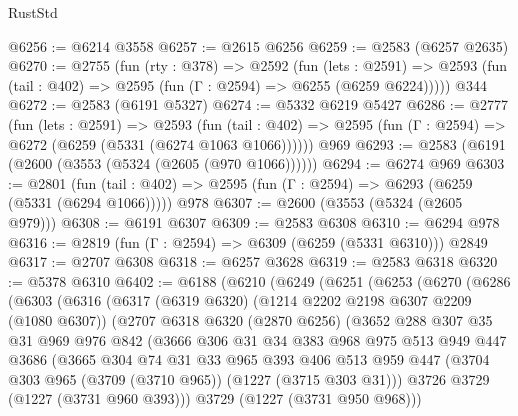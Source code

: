 \begin{lexlean}{RustStd}
\begin{coremodule}
@6256 := @6214 @3558
@6257 := @2615 @6256
@6259 := @2583 (@6257 @2635)
@6270 := @2755
    (fun (rty : @378) =>
    @2592
      (fun (lets : @2591) =>
      @2593 (fun (tail : @402) => @2595 (fun (Γ : @2594) => @6255 (@6259 @6224)))))
    @344
@6272 := @2583 (@6191 @5327)
@6274 := @5332 @6219 @5427
@6286 := @2777
    (fun (lets : @2591) =>
    @2593
      (fun (tail : @402) => @2595 (fun (Γ : @2594) => @6272 (@6259 (@5331 (@6274 @1063 @1066))))))
    @969
@6293 := @2583 (@6191 (@2600 (@3553 (@5324 (@2605 (@970 @1066))))))
@6294 := @6274 @969
@6303 := @2801
    (fun (tail : @402) => @2595 (fun (Γ : @2594) => @6293 (@6259 (@5331 (@6294 @1066)))))
    @978
@6307 := @2600 (@3553 (@5324 (@2605 @979)))
@6308 := @6191 @6307
@6309 := @2583 @6308
@6310 := @6294 @978
@6316 := @2819 (fun (Γ : @2594) => @6309 (@6259 (@5331 @6310))) @2849
@6317 := @2707 @6308
@6318 := @6257 @3628
@6319 := @2583 @6318
@6320 := @5378 @6310
@6402 := @6188
    (@6210
      (@6249
        (@6251
          (@6253
            (@6270
              (@6286
                (@6303
                  (@6316
                    (@6317
                      (@6319 @6320)
                      (@1214 @2202 @2198 @6307 @2209 (@1080 @6307))
                      (@2707
                        @6318
                        @6320
                        (@2870 @6256)
                        (@3652
                          @288
                          @307
                          @35
                          @31
                          @969
                          @976
                          @842
                          (@3666
                            @306
                            @31
                            @34
                            @383
                            @968
                            @975
                            @513
                            @949
                            @447
                            @3686
                            (@3665
                              @304
                              @74
                              @31
                              @33
                              @965
                              @393
                              @406
                              @513
                              @959
                              @447
                              (@3704 @303 @965 (@3709 (@3710 @965)) (@1227 (@3715 @303 @31)))
                              @3726
                              @3729
                              (@1227 (@3731 @960 @393)))
                            @3729
                            (@1227 (@3731 @950 @968)))

\end{coremodule}
\end{lexlean}
